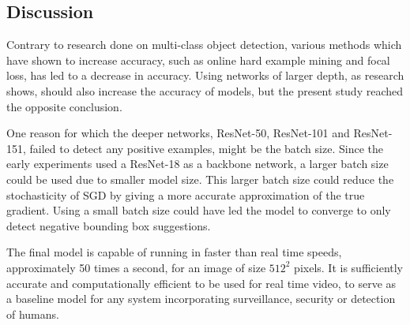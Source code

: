 \documentclass[paperwidth=48in,paperheight=48in, fontscale=0.4166666666666, landscape]{baposter}
\begin{document}
\begin{poster}
{\subsection{Discussion}
Contrary to research done on multi-class object detection, various methods which have shown to increase accuracy, such as online hard example mining and focal loss, has led to a decrease in accuracy. Using networks of larger depth, as research \cite{retinanet} \cite{resnet} shows, should also increase the accuracy of models, but the present study reached the opposite conclusion.

One reason for which the deeper networks, ResNet-50, ResNet-101 and ResNet-151, failed to detect any positive examples, might be the batch size. Since the early experiments used a ResNet-18 as a backbone network, a larger batch size could be used due to smaller model size. This larger batch size could reduce the stochasticity of SGD by giving a more accurate approximation of the true gradient. Using a small batch size could have led the model to converge to only detect negative bounding box suggestions.

The final model is capable of running in faster than real time speeds, approximately 50 times a second, for an image of size $512^2$ pixels. It is sufficiently accurate and computationally efficient to be used for real time video, to serve as a baseline model for any system incorporating surveillance, security or detection of humans.


}



\end{poster}
\end{document}
